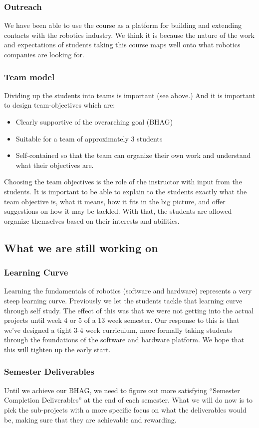 \subsubsection{Outreach} We have been able to use the course as a platform for building and extending contacts with the robotics industry. We think it is because the nature of the work and expectations of students taking this course maps well onto what robotics companies are looking for.
\subsubsection{Team model}Dividing up the students into teams is important (see above.) And it is important to design team-objectives which are:
\begin{itemize}
\item Clearly supportive of the overarching goal (BHAG)
\item Suitable for a team of approximately 3 students
\item Self-contained so that the team can organize their own work and understand what their objectives are.
\end{itemize}
Choosing the team objectives is the role of the instructor with input from the students. It is important to be able to explain to the students exactly what the team objective is, what it means, how it fits in the big picture, and offer suggestions on how it may be tackled. With that, the students are allowed organize themselves based on their interests and abilities.

\subsection{What we are still working on}
\subsubsection{Learning Curve}Learning the fundamentals of robotics (software and hardware) represents a very steep learning curve. Previously we let the students tackle that learning curve through self study. The effect of this was that we were not getting into the actual projects until week 4 or 5 of a 13 week semester. Our response to this is that we've designed a tight 3-4 week curriculum, more formally taking students through the foundations of the software and hardware platform. We hope that this will tighten up the early start.
\subsubsection{Semester Deliverables}Until we achieve our BHAG, we need to figure out more satisfying ``Semester Completion Deliverables'' at the end of each semester. What we will do now is to pick the sub-projects with a more specific focus on what the deliverables would be, making sure that they are achievable and rewarding.
